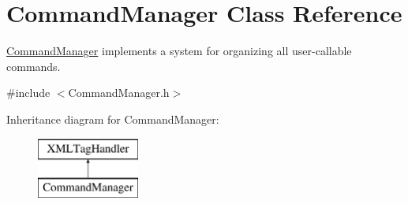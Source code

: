 \hypertarget{class_command_manager}{}\section{Command\+Manager Class Reference}
\label{class_command_manager}


\hyperlink{class_command_manager}{Command\+Manager} implements a system for organizing all user-\/callable commands.  




{\ttfamily \#include $<$Command\+Manager.\+h$>$}

Inheritance diagram for Command\+Manager\+:\begin{figure}[H]
\begin{center}
\leavevmode
\includegraphics[height=2.000000cm]{class_command_manager}
\end{center}
\end{figure}
